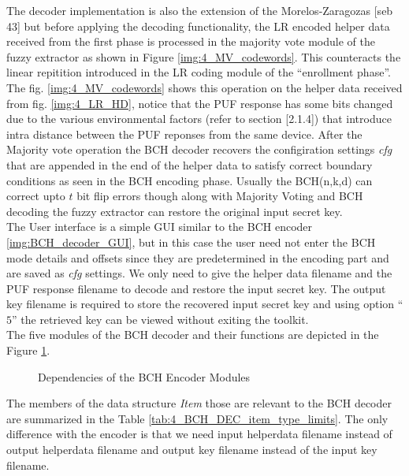 	The decoder implementation is also the extension of the Morelos-Zaragozas [seb 43] but before applying the decoding functionality, the LR encoded helper data received from the first phase is processed in the majority vote module of the fuzzy extractor as shown in Figure \ref{img:4_MV_codewords}. This counteracts the linear repitition introduced in the LR coding module of the ``enrollment phase''. The fig. \ref{img:4_MV_codewords} shows this operation on the helper data received from fig. \ref{img:4_LR_HD}, notice that the PUF
	response has some bits changed due to the various environmental factors (refer to section [2.1.4]) that introduce intra distance between the PUF reponses from the same device. After the Majority vote operation the BCH decoder recovers the configiration settings \emph{cfg} that are appended in the end of the helper data to satisfy correct boundary conditions as seen in the BCH encoding phase. Usually the BCH(n,k,d) can correct upto $t$ bit flip errors though along with Majority
	Voting and BCH decoding the fuzzy extractor can restore the original input secret key.\\

	The User interface is a simple GUI similar to the BCH encoder \ref{img:BCH_decoder_GUI}, but in this case the user need not enter the BCH mode details and offsets since they are predetermined in the encoding part and are saved as \emph{cfg} settings. We only need to give the helper data filename and the PUF response filename to decode and restore the input secret key. The output key filename is required to store the recovered input secret key and using option ``$5$'' the retrieved key can be viewed without
	exiting the toolkit.\\

	The five modules of the BCH decoder and their functions are depicted in the Figure \ref{img:bchdec_fns}.
	\begin{figure}
	\centering
	\caption{Dependencies of the BCH Encoder Modules}
	\label{img:bchdec_fns}
	\end{figure}

	The members of the data structure \emph{Item} those are relevant to the BCH decoder are summarized in the Table \ref{tab:4_BCH_DEC_item_type_limits}. The only difference with the encoder is that we need input helperdata filename instead of output helperdata filename and output key filename instead of the input key filename.

